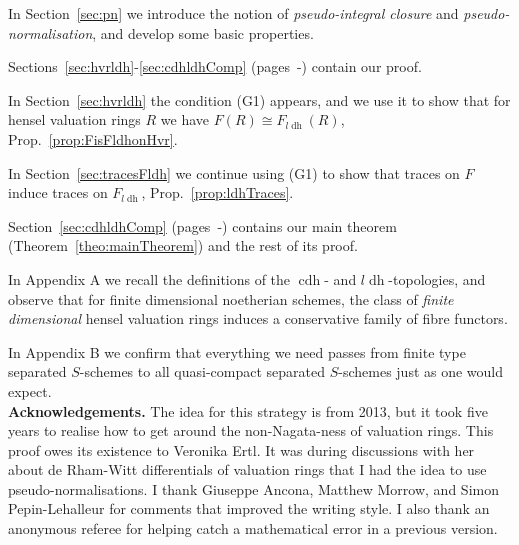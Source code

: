 \documentclass[10pt]{amsart}
\theoremstyle{definition}
\newcommand{\ulh}{\underline{H}}
\newcommand{\cdh}{{{\operatorname{cdh}}}}
\newcommand{\ldh}{{l{\operatorname{dh}}}}
\begin{document}
In Section~\ref{sec:pn} we introduce the notion of \emph{pseudo-integral closure} and \emph{pseudo-normalisation}, and develop some basic properties.


Sections~\ref{sec:hvrldh}-\ref{sec:cdhldhComp} (pages~\pageref{sec:hvrldh}-\pageref{sec:cdhldh}) contain our proof.

In Section~\ref{sec:hvrldh} the condition (G1) appears, and we use it to show that for hensel valuation rings $R$ we have $F(R) \cong F_\ldh(R)$, Prop.~\ref{prop:FisFldhonHvr}.

In Section~\ref{sec:tracesFldh} we continue using (G1) to show that traces on $F$ induce traces on $F_\ldh$, Prop.~\ref{prop:ldhTraces}.

Section~\ref{sec:cdhldhComp} (pages~\pageref{sec:cdhldhComp}-\pageref{sec:cdhldh}) contains our main theorem (Theorem~\ref{theo:mainTheorem}) %
 and the rest of its proof.


In Appendix A %
we recall the definitions of the $\cdh$- and $\ldh$-topologies, and observe that for finite dimensional noetherian schemes, the class of \emph{finite dimensional} hensel valuation rings induces a conservative family of fibre functors.

In Appendix B %
we confirm that everything we need passes from finite type separated $S$-schemes to all quasi-compact separated $S$-schemes just as one would expect. \\

\textbf{Acknowledgements.} The idea for this strategy is from 2013, but it took five years to realise how to get around the non-Nagata-ness of valuation rings. This proof owes its existence to Veronika Ertl. It was during discussions with her about de Rham-Witt differentials of valuation rings that I had the idea to use pseudo-normalisations. I thank Giuseppe Ancona, Matthew Morrow, and Simon Pepin-Lehalleur for comments that improved the writing style. I also thank an anonymous referee for helping catch a mathematical error in a previous version.
\end{document}
